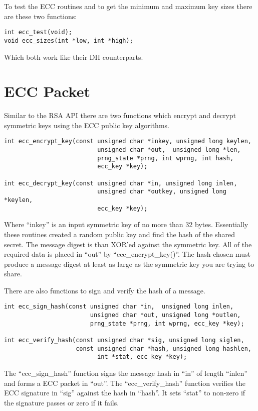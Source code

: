 \documentclass[b5paper]{book}
\begin{document}
To test the ECC routines and to get the minimum and maximum key sizes there are these two functions:
\begin{verbatim}
int ecc_test(void);
void ecc_sizes(int *low, int *high);
\end{verbatim}
Which both work like their DH counterparts.

\section{ECC Packet}
Similar to the RSA API there are two functions which encrypt and decrypt symmetric keys using the ECC public key
algorithms.
\begin{verbatim}
int ecc_encrypt_key(const unsigned char *inkey, unsigned long keylen,
                          unsigned char *out,  unsigned long *len, 
                          prng_state *prng, int wprng, int hash, 
                          ecc_key *key);

int ecc_decrypt_key(const unsigned char *in, unsigned long inlen,
                          unsigned char *outkey, unsigned long *keylen, 
                          ecc_key *key);
\end{verbatim}

Where ``inkey'' is an input symmetric key of no more than 32 bytes.  Essentially these routines created a random public key
and find the hash of the shared secret.  The message digest is than XOR'ed against the symmetric key.  All of the required
data is placed in ``out'' by ``ecc\_encrypt\_key()''.   The hash chosen must produce a message digest at least as large
as the symmetric key you are trying to share.

There are also functions to sign and verify the hash of a message.
\begin{verbatim}
int ecc_sign_hash(const unsigned char *in,  unsigned long inlen,
                        unsigned char *out, unsigned long *outlen,
                        prng_state *prng, int wprng, ecc_key *key);

int ecc_verify_hash(const unsigned char *sig, unsigned long siglen,
                    const unsigned char *hash, unsigned long hashlen, 
                          int *stat, ecc_key *key);
\end{verbatim}

The ``ecc\_sign\_hash'' function signs the message hash in ``in'' of length ``inlen'' and forms a ECC packet in ``out''.  
The ``ecc\_verify\_hash'' function verifies the ECC signature in ``sig'' against the hash in ``hash''.  It sets ``stat''
to non-zero if the signature passes or zero if it fails.
\end{document}
